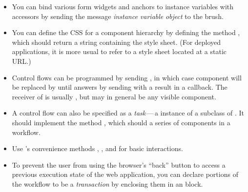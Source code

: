 \documentclass[a4paper,10pt,twoside]{book}
\begin{document}
\begin{itemize}
  \item You can bind various form widgets and anchors to instance variables with accessors by sending the message  \emph{instance variable}  \emph{object} to the brush.
  \item You can define the CSS for a component hierarchy by defining the method , which should return a string containing the style sheet.
  (For deployed applications, it is more usual to refer to a style sheet located at a static URL.)
  \item Control flows can be programmed by sending , in which case component  will be replaced by  until  answers by sending  with a result in a callback.
  The receiver of  is usually , but may in general be any visible component.
  \item A control flow can also be specified as a \emph{task}\,---\,a instance of a subclass of . It should implement the method , which should  a series of components in a workflow.
  \item Use 's convenience methods , ,  and  for basic interactions.
  \item To prevent the user from using the browser's ``back'' button to access a previous execution state of the web application, you can declare portions of the workflow to be a \emph{transaction} by enclosing them in an  block.
\end{itemize}

\ifx\wholebook\relax\else 
   
   
\end{document}
